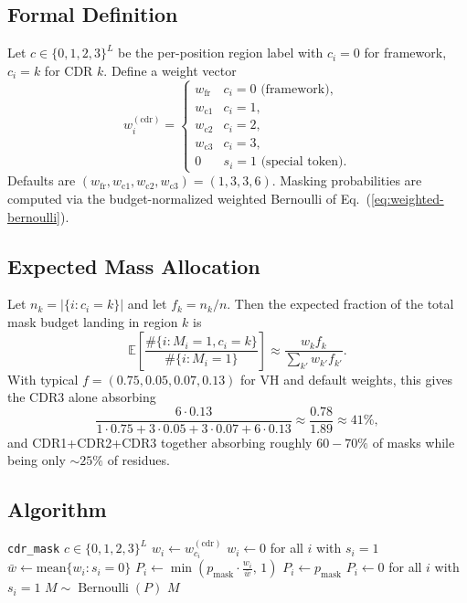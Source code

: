 \documentclass[11pt]{article}
\newcommand{\pmask}{p_{\text{mask}}}
\newcommand{\E}{\mathbb{E}}
\DeclareMathOperator{\Bern}{Bernoulli}
\begin{document}
\subsection{Formal Definition}
Let $c \in \{0,1,2,3\}^L$ be the per-position region label with
$c_i = 0$ for framework, $c_i = k$ for CDR $k$. Define a weight vector
\begin{equation}
w^{(\text{cdr})}_i =
\begin{cases}
w_{\text{fr}} & c_i = 0 \text{ (framework)}, \\
w_{\text{c1}} & c_i = 1, \\
w_{\text{c2}} & c_i = 2, \\
w_{\text{c3}} & c_i = 3, \\
0 & s_i = 1 \text{ (special token)}.
\end{cases}
\end{equation}
Defaults are $(w_{\text{fr}}, w_{\text{c1}}, w_{\text{c2}}, w_{\text{c3}})
= (1, 3, 3, 6)$. Masking probabilities are computed via the
budget-normalized weighted Bernoulli of
Eq.~(\ref{eq:weighted-bernoulli}).

\subsection{Expected Mass Allocation}
Let $n_k = |\{i : c_i = k\}|$ and let $f_k = n_k / n$. Then the expected
fraction of the total mask budget landing in region $k$ is
\begin{equation}
\E\!\left[\frac{\#\{i : M_i = 1, c_i = k\}}{\#\{i : M_i = 1\}}\right]
\approx \frac{w_k f_k}{\sum_{k'} w_{k'} f_{k'}}.
\end{equation}
With typical $f = (0.75, 0.05, 0.07, 0.13)$ for VH and default weights,
this gives the CDR3 alone absorbing
\begin{equation}
\frac{6 \cdot 0.13}{1 \cdot 0.75 + 3 \cdot 0.05 + 3 \cdot 0.07 + 6 \cdot 0.13}
\approx \frac{0.78}{1.89} \approx 41\%,
\end{equation}
and CDR1+CDR2+CDR3 together absorbing roughly $60{-}70\%$ of masks
while being only $\sim 25\%$ of residues.

\subsection{Algorithm}
\begin{algorithm}[H]
\caption{CDR-Focused Masking}
\begin{algorithmic}[1]
\Require \texttt{cdr\_mask} $c \in \{0,1,2,3\}^L$
 \Return {} \EndIf
\State $w_i \gets w^{(\text{cdr})}_{c_i}$ 
\State $w_i \gets 0$ for all $i$ with $s_i = 1$
\State $\bar w \gets \text{mean}\{w_i : s_i = 0\}$
  \State $P_i \gets \min\!\left(\pmask \cdot \tfrac{w_i}{\bar w},\, 1\right)$
\Else
  \State $P_i \gets \pmask$
\EndIf
\State $P_i \gets 0$ for all $i$ with $s_i = 1$
\State $M \sim \Bern(P)$
\State \Return $M$
\end{algorithmic}
\end{algorithm}
\end{document}
